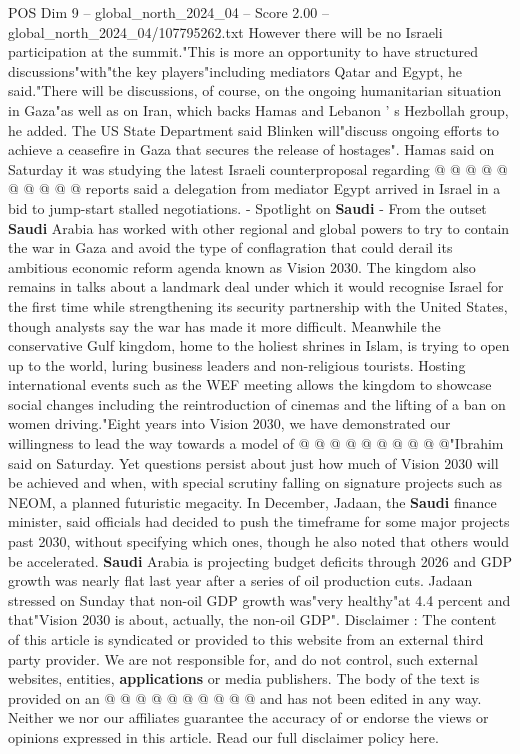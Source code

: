 \begin{textsample}{POS Dim 9 – global\_north\_2024\_04 – Score 2.00 – global\_north\_2024\_04/107795262.txt}
However there will be no Israeli participation at the summit."This is more an opportunity to have structured discussions"with"the key players"including mediators Qatar and Egypt, he said."There will be discussions, of course, on the ongoing humanitarian situation in Gaza"as well as on Iran, which backs Hamas and Lebanon ' s Hezbollah group, he added.
The US State Department said Blinken will"discuss ongoing efforts to achieve a ceasefire in Gaza that secures the release of hostages".
Hamas said on Saturday it was studying the latest Israeli counterproposal regarding @ @ @ @ @ @ @ @ @ @ reports said a delegation from mediator Egypt arrived in Israel in a bid to jump-start stalled negotiations. - Spotlight on \textbf{Saudi} - From the outset \textbf{Saudi} Arabia has worked with other regional and global powers to try to contain the war in Gaza and avoid the type of conflagration that could derail its ambitious economic reform agenda known as Vision 2030.
The kingdom also remains in talks about a landmark deal under which it would recognise Israel for the first time while strengthening its security partnership with the United States, though analysts say the war has made it more difficult.
Meanwhile the conservative Gulf kingdom, home to the holiest shrines in Islam, is trying to open up to the world, luring business leaders and non-religious tourists.
Hosting international events such as the WEF meeting allows the kingdom to showcase social changes including the reintroduction of cinemas and the lifting of a ban on women driving."Eight years into Vision 2030, we have demonstrated our willingness to lead the way towards a model of @ @ @ @ @ @ @ @ @ @"Ibrahim said on Saturday.
Yet questions persist about just how much of Vision 2030 will be achieved and when, with special scrutiny falling on signature projects such as NEOM, a planned futuristic megacity.
In December, Jadaan, the \textbf{Saudi} finance minister, said officials had decided to push the timeframe for some major projects past 2030, without specifying which ones, though he also noted that others would be accelerated. \textbf{Saudi} Arabia is projecting budget deficits through 2026 and GDP growth was nearly flat last year after a series of oil production cuts.
Jadaan stressed on Sunday that non-oil GDP growth was"very healthy"at 4.4 percent and that"Vision 2030 is about, actually, the non-oil GDP".
Disclaimer : The content of this article is syndicated or provided to this website from an external third party provider.
We are not responsible for, and do not control, such external websites, entities, \textbf{applications} or media publishers.
The body of the text is provided on an @ @ @ @ @ @ @ @ @ @ and has not been edited in any way.
Neither we nor our affiliates guarantee the accuracy of or endorse the views or opinions expressed in this article.
Read our full disclaimer policy here.

\end{textsample}

